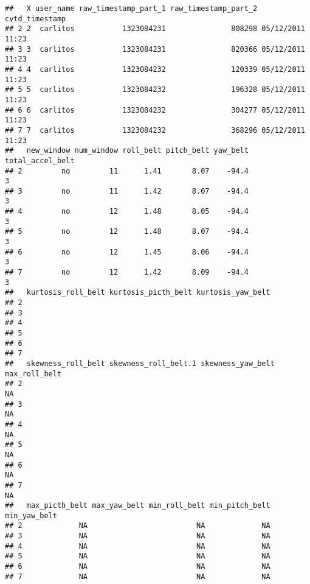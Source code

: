 \documentclass[]{article}
\begin{document}
\begin{verbatim}
##   X user_name raw_timestamp_part_1 raw_timestamp_part_2   cvtd_timestamp
## 2 2  carlitos           1323084231               808298 05/12/2011 11:23
## 3 3  carlitos           1323084231               820366 05/12/2011 11:23
## 4 4  carlitos           1323084232               120339 05/12/2011 11:23
## 5 5  carlitos           1323084232               196328 05/12/2011 11:23
## 6 6  carlitos           1323084232               304277 05/12/2011 11:23
## 7 7  carlitos           1323084232               368296 05/12/2011 11:23
##   new_window num_window roll_belt pitch_belt yaw_belt total_accel_belt
## 2         no         11      1.41       8.07    -94.4                3
## 3         no         11      1.42       8.07    -94.4                3
## 4         no         12      1.48       8.05    -94.4                3
## 5         no         12      1.48       8.07    -94.4                3
## 6         no         12      1.45       8.06    -94.4                3
## 7         no         12      1.42       8.09    -94.4                3
##   kurtosis_roll_belt kurtosis_picth_belt kurtosis_yaw_belt
## 2                                                         
## 3                                                         
## 4                                                         
## 5                                                         
## 6                                                         
## 7                                                         
##   skewness_roll_belt skewness_roll_belt.1 skewness_yaw_belt max_roll_belt
## 2                                                                      NA
## 3                                                                      NA
## 4                                                                      NA
## 5                                                                      NA
## 6                                                                      NA
## 7                                                                      NA
##   max_picth_belt max_yaw_belt min_roll_belt min_pitch_belt min_yaw_belt
## 2             NA                         NA             NA             
## 3             NA                         NA             NA             
## 4             NA                         NA             NA             
## 5             NA                         NA             NA             
## 6             NA                         NA             NA             
## 7             NA                         NA             NA             

\end{verbatim}
\end{document}
